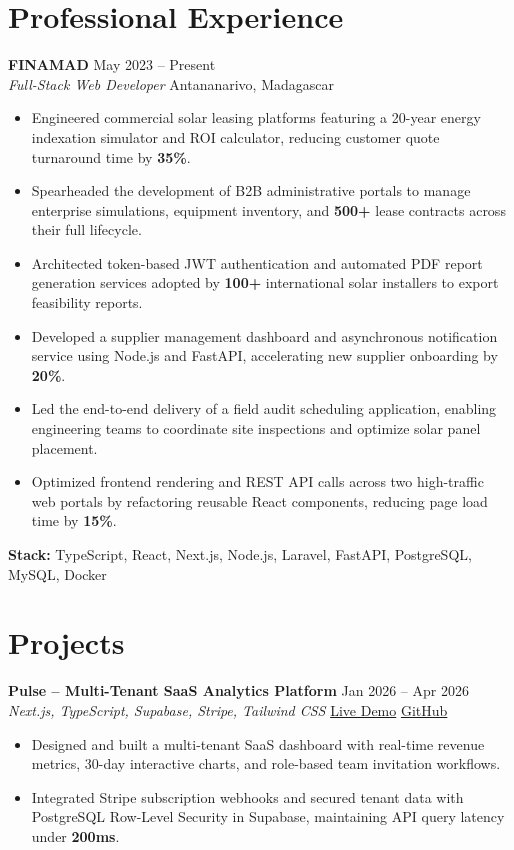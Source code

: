 \documentclass[10pt,a4paper]{article}
\newcommand{\entry}[4]{%
  {\bfseries #1} \hfill {\color{muted}#2}\\
  {\color{accent}\itshape #3} \hfill {\color{muted}\small #4}\par
  \vspace{1pt}}
\newcommand{\sep}{\hspace{4pt}{\color{muted}|}\hspace{4pt}}
\begin{document}
\section*{Professional Experience}
\entry{FINAMAD}{May 2023 -- Present}%
{Full-Stack Web Developer}{Antananarivo, Madagascar}
\begin{itemize}
  \item Engineered commercial solar leasing platforms featuring a 20-year
        energy indexation simulator and ROI calculator, reducing customer
        quote turnaround time by \textbf{35\%}.
  \item Spearheaded the development of B2B administrative portals to manage
        enterprise simulations, equipment inventory, and \textbf{500+} lease
        contracts across their full lifecycle.
  \item Architected token-based JWT authentication and automated PDF report
        generation services adopted by \textbf{100+} international solar
        installers to export feasibility reports.
  \item Developed a supplier management dashboard and asynchronous
        notification service using Node.js and FastAPI, accelerating new
        supplier onboarding by \textbf{20\%}.
  \item Led the end-to-end delivery of a field audit scheduling application,
        enabling engineering teams to coordinate site inspections and
        optimize solar panel placement.
  \item Optimized frontend rendering and REST API calls across two
        high-traffic web portals by refactoring reusable React components,
        reducing page load time by \textbf{15\%}.
\end{itemize}
\vspace{2pt}
{\small\color{muted}\textbf{Stack:} TypeScript, React, Next.js, Node.js, Laravel, 
FastAPI, PostgreSQL, MySQL, Docker}

\vfill

\section*{Projects}
\entry{Pulse -- Multi-Tenant SaaS Analytics Platform}{Jan 2026 -- Apr 2026}%
{Next.js, TypeScript, Supabase, Stripe, Tailwind CSS}%
{\href{https://pulse-dashboard-theta-swart.vercel.app/}{Live Demo}\sep
 \href{https://github.com/junnot-daniel}{GitHub}}
\begin{itemize}
  \item Designed and built a multi-tenant SaaS dashboard with real-time
        revenue metrics, 30-day interactive charts, and role-based team
        invitation workflows.
  \item Integrated Stripe subscription webhooks and secured tenant data with
        PostgreSQL Row-Level Security in Supabase, maintaining API query
        latency under \textbf{200ms}.
\end{itemize}
\vspace{5pt}
\end{document}
